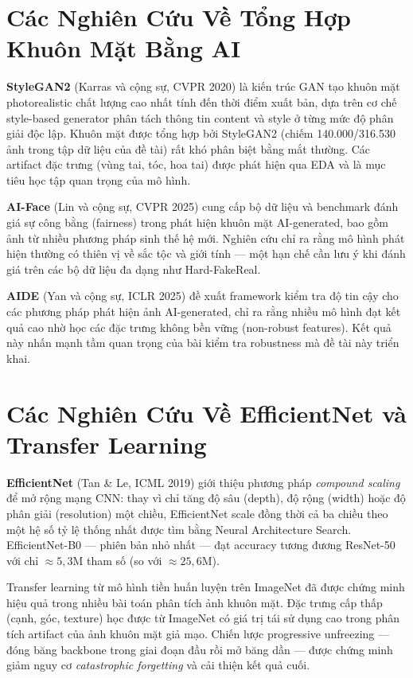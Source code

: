 \section{Các Nghiên Cứu Về Tổng Hợp Khuôn Mặt Bằng AI}

\textbf{StyleGAN2} \cite{karras2020stylegan2} (Karras và cộng sự, CVPR 2020) là kiến trúc GAN tạo khuôn mặt photorealistic chất lượng cao nhất tính đến thời điểm xuất bản, dựa trên cơ chế style-based generator phân tách thông tin content và style ở từng mức độ phân giải độc lập. Khuôn mặt được tổng hợp bởi StyleGAN2 (chiếm 140.000/316.530 ảnh trong tập dữ liệu của đề tài) rất khó phân biệt bằng mắt thường. Các artifact đặc trưng (vùng tai, tóc, hoa tai) được phát hiện qua EDA và là mục tiêu học tập quan trọng của mô hình.

\textbf{AI-Face} \cite{lin2025aiface} (Lin và cộng sự, CVPR 2025) cung cấp bộ dữ liệu và benchmark đánh giá sự công bằng (fairness) trong phát hiện khuôn mặt AI-generated, bao gồm ảnh từ nhiều phương pháp sinh thế hệ mới. Nghiên cứu chỉ ra rằng mô hình phát hiện thường có thiên vị về sắc tộc và giới tính --- một hạn chế cần lưu ý khi đánh giá trên các bộ dữ liệu đa dạng như Hard-FakeReal.

\textbf{AIDE} \cite{yan2025aide} (Yan và cộng sự, ICLR 2025) đề xuất framework kiểm tra độ tin cậy cho các phương pháp phát hiện ảnh AI-generated, chỉ ra rằng nhiều mô hình đạt kết quả cao nhờ học các đặc trưng không bền vững (non-robust features). Kết quả này nhấn mạnh tầm quan trọng của bài kiểm tra robustness mà đề tài này triển khai.

\section{Các Nghiên Cứu Về EfficientNet và Transfer Learning}

\textbf{EfficientNet} \cite{tan2019efficientnet} (Tan \& Le, ICML 2019) giới thiệu phương pháp \textit{compound scaling} để mở rộng mạng CNN: thay vì chỉ tăng độ sâu (depth), độ rộng (width) hoặc độ phân giải (resolution) một chiều, EfficientNet scale đồng thời cả ba chiều theo một hệ số tỷ lệ thống nhất được tìm bằng Neural Architecture Search. EfficientNet-B0 --- phiên bản nhỏ nhất --- đạt accuracy tương đương ResNet-50 với chỉ $\approx 5{,}3$M tham số (so với $\approx 25{,}6$M).

Transfer learning từ mô hình tiền huấn luyện trên ImageNet đã được chứng minh hiệu quả trong nhiều bài toán phân tích ảnh khuôn mặt. Đặc trưng cấp thấp (cạnh, góc, texture) học được từ ImageNet có giá trị tái sử dụng cao trong phân tích artifact của ảnh khuôn mặt giả mạo. Chiến lược progressive unfreezing --- đóng băng backbone trong giai đoạn đầu rồi mở băng dần --- được chứng minh giảm nguy cơ \textit{catastrophic forgetting} và cải thiện kết quả cuối.

